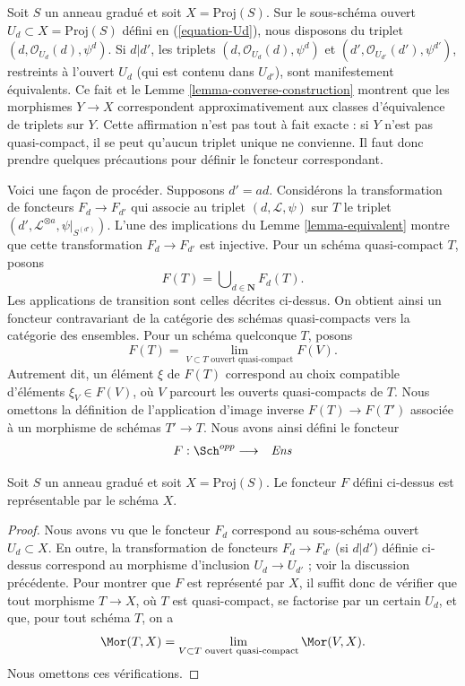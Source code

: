 \noindent
Soit $S$ un anneau gradué et soit $X = \text{Proj}(S)$. Sur le sous-schéma
ouvert $U_d \subset X = \text{Proj}(S)$ défini en (\ref{equation-Ud}), nous
disposons du triplet $(d, \mathcal{O}_{U_d}(d), \psi^d)$. Si $d | d'$, les
triplets $(d, \mathcal{O}_{U_d}(d), \psi^d)$ et
$(d', \mathcal{O}_{U_{d'}}(d'), \psi^{d'})$, restreints à l'ouvert $U_d$
(qui est contenu dans $U_{d'}$), sont manifestement équivalents. Ce fait et le
Lemme \ref{lemma-converse-construction} montrent que les morphismes
$Y \to X$ correspondent approximativement aux classes d'équivalence de
triplets sur $Y$. Cette affirmation n'est pas tout à fait exacte : si $Y$
n'est pas quasi-compact, il se peut qu'aucun triplet unique ne convienne.
Il faut donc prendre quelques précautions pour définir le foncteur
correspondant.

\medskip\noindent
Voici une façon de procéder. Supposons $d' = ad$. Considérons la transformation
de foncteurs $F_d \to F_{d'}$ qui associe au triplet
$(d, \mathcal{L}, \psi)$ sur $T$ le triplet
$(d', \mathcal{L}^{\otimes a}, \psi|_{S^{(d')}})$.
L'une des implications du Lemme \ref{lemma-equivalent} montre que cette
transformation $F_d \to F_{d'}$ est injective. Pour un schéma quasi-compact
$T$, posons
$$
F(T) = \bigcup\nolimits_{d \in \mathbf{N}} F_d(T).
$$
Les applications de transition sont celles décrites ci-dessus. On obtient
ainsi un foncteur contravariant de la catégorie des schémas quasi-compacts vers
la catégorie des ensembles. Pour un schéma quelconque $T$, posons
$$
F(T)
=
\lim_{V \subset T\text{ ouvert quasi-compact}} F(V).
$$
Autrement dit, un élément $\xi$ de $F(T)$ correspond au choix compatible
d'éléments $\xi_V \in F(V)$, où $V$ parcourt les ouverts quasi-compacts de
$T$. Nous omettons la définition de l'application d'image inverse
$F(T) \to F(T')$ associée à un morphisme de schémas $T' \to T$.
Nous avons ainsi défini le foncteur
\begin{eqnarray*}
F : \Sch^{opp} & \longrightarrow & \textit{Ens}
\end{eqnarray*}

\begin{lemma}
\label{lemma-proj-functor}
Soit $S$ un anneau gradué et soit $X = \text{Proj}(S)$. Le foncteur $F$ défini
ci-dessus est représentable par le schéma $X$.
\end{lemma}

\begin{proof}
Nous avons vu que le foncteur $F_d$ correspond au sous-schéma ouvert
$U_d \subset X$. En outre, la transformation de foncteurs
$F_d \to F_{d'}$ (si $d | d'$) définie ci-dessus correspond au morphisme
d'inclusion $U_d \to U_{d'}$ ; voir la discussion précédente. Pour montrer
que $F$ est représenté par $X$, il suffit donc de vérifier que tout morphisme
$T \to X$, où $T$ est quasi-compact, se factorise par un certain $U_d$, et que,
pour tout schéma $T$, on a
$$
\Mor(T, X)
=
\lim_{V \subset T\text{ ouvert quasi-compact}} \Mor(V, X).
$$
Nous omettons ces vérifications.
\end{proof}


